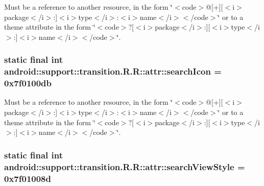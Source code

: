 Must be a reference to another resource, in the form \char`\"{}$<$code$>$@\mbox{[}+\mbox{]}\mbox{[}$<$i$>$package$<$/i$>$:\mbox{]}$<$i$>$type$<$/i$>$:$<$i$>$name$<$/i$>$$<$/code$>$\char`\"{} or to a theme attribute in the form \char`\"{}$<$code$>$?\mbox{[}$<$i$>$package$<$/i$>$:\mbox{]}\mbox{[}$<$i$>$type$<$/i$>$:\mbox{]}$<$i$>$name$<$/i$>$$<$/code$>$\char`\"{}. \hypertarget{classandroid_1_1support_1_1transition_1_1_r_1_1attr_df492fb899b7ae42029c61d57f0795f6}{
\subsubsection[{searchIcon}]{\setlength{\rightskip}{0pt plus 5cm}static final int android::support::transition.R.R::attr::searchIcon = 0x7f0100db}}
\label{classandroid_1_1support_1_1transition_1_1_r_1_1attr_df492fb899b7ae42029c61d57f0795f6}


Must be a reference to another resource, in the form \char`\"{}$<$code$>$@\mbox{[}+\mbox{]}\mbox{[}$<$i$>$package$<$/i$>$:\mbox{]}$<$i$>$type$<$/i$>$:$<$i$>$name$<$/i$>$$<$/code$>$\char`\"{} or to a theme attribute in the form \char`\"{}$<$code$>$?\mbox{[}$<$i$>$package$<$/i$>$:\mbox{]}\mbox{[}$<$i$>$type$<$/i$>$:\mbox{]}$<$i$>$name$<$/i$>$$<$/code$>$\char`\"{}. \hypertarget{classandroid_1_1support_1_1transition_1_1_r_1_1attr_2e4dd6b363c18bc74da4b0b9a6e9fe33}{
\subsubsection[{searchViewStyle}]{\setlength{\rightskip}{0pt plus 5cm}static final int android::support::transition.R.R::attr::searchViewStyle = 0x7f01008d}}
\label{classandroid_1_1support_1_1transition_1_1_r_1_1attr_2e4dd6b363c18bc74da4b0b9a6e9fe33}


